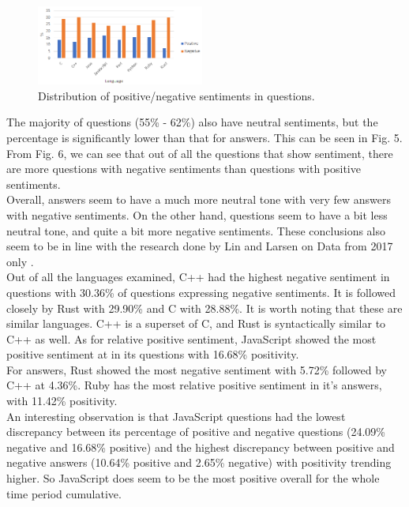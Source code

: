 \documentclass[conference]{IEEEtran}
\begin{document}
\begin{figure}[htbp]
\centerline{\includegraphics[width=0.49\textwidth]{figures/summQ.png}}
\caption{Distribution of positive/negative sentiments in questions.}
\label{fig}
\end{figure}

The majority of questions (55\% - 62\%) also have neutral sentiments, but the percentage is significantly lower than that for answers. This can be seen in Fig. 5. From Fig. 6, we can see that out of all the questions that show sentiment, there are more questions with negative sentiments than questions with positive sentiments. \\

Overall, answers seem to have a much more neutral tone with very few answers with negative sentiments. On the other hand, questions seem to have a bit less neutral tone, and quite a bit more negative sentiments. These conclusions also seem to be in line with the research done by Lin and Larsen on Data from 2017 only \cite{b11}.\\

Out of all the languages examined, C++ had the highest negative sentiment in questions with 30.36\% of questions expressing negative sentiments. It is followed closely by Rust with 29.90\% and C with 28.88\%. It is worth noting that these are similar languages. C++ is a superset of C, and Rust is syntactically similar to C++ as well\cite{b37}. As for relative positive sentiment, JavaScript showed the most positive sentiment at in its questions with 16.68\% positivity.\\

For answers, Rust showed the most negative sentiment with 5.72\% followed by C++ at 4.36\%. Ruby has the most relative positive sentiment in it's answers, with 11.42\% positivity.\\

An interesting observation is that JavaScript questions had the lowest discrepancy between its percentage of positive and negative questions (24.09\% negative and 16.68\% positive) and the highest discrepancy between positive and negative answers (10.64\% positive and 2.65\% negative) with positivity trending higher. So JavaScript does seem to be the most positive overall for the whole time period cumulative.
\end{document}
